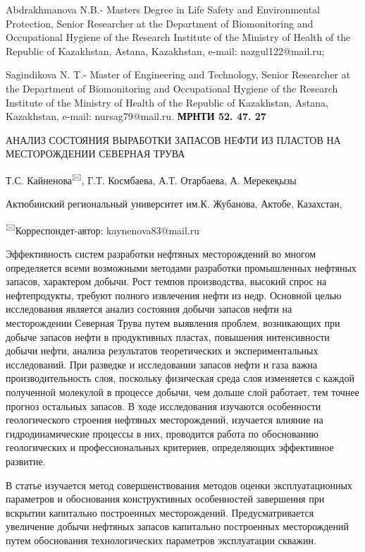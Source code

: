 Abdrakhmanova N.B.- Master\textquotesingle s Degree in Life Safety and
Environmental Protection, Senior Researcher at the Department of
Biomonitoring and Occupational Hygiene of the Research Institute of the
Ministry of Health of the Republic of Kazakhstan, Astana, Kazakhstan,
e-mail: nazgul122@mail.ru;

Sagindikova N. T.- Master of Engineering and Technology, Senior
Researcher at the Department of Biomonitoring and Occupational Hygiene
of the Research Institute of the Ministry of Health of the Republic of
Kazakhstan, Astana, Kazakhstan, e-mail: nursag79@mail.ru.\newpage
{\bfseries МРНТИ 52. 47. 27}

АНАЛИЗ СОСТОЯНИЯ ВЫРАБОТКИ ЗАПАСОВ НЕФТИ ИЗ ПЛАСТОВ НА МЕСТОРОЖДЕНИИ
СЕВЕРНАЯ ТРУВА

Т.С. Кайненова\textsuperscript{🖂}, Г.Т. Космбаева, А.Т. Отарбаева, А.
Мерекеқызы

Актюбинский региональный университет им.К. Жубанова, Актобе, Казахстан,

\textsuperscript{🖂}Корреспондет-автор: kaynenova83@mail.ru

Эффективность систем разработки нефтяных месторождений во многом
определяется всеми возможными методами разработки промышленных нефтяных
запасов, характером добычи. Рост темпов производства, высокий спрос на
нефтепродукты, требуют полного извлечения нефти из недр. Основной целью
исследования является анализ состояния добычи запасов нефти на
месторождении Северная Трува путем выявления проблем, возникающих при
добыче запасов нефти в продуктивных пластах, повышения интенсивности
добычи нефти, анализа результатов теоретических и экспериментальных
исследований. При разведке и исследовании запасов нефти и газа важна
производительность слоя, поскольку физическая среда слоя изменяется с
каждой полученной молекулой в процессе добычи, чем дольше слой работает,
тем точнее прогноз остальных запасов. В ходе исследования изучаются
особенности геологического строения нефтяных месторождений, изучается
влияние на гидродинамические процессы в них, проводится работа по
обоснованию геологических и профессиональных критериев, определяющих
эффективное развитие.

В статье изучается метод совершенствования методов оценки
эксплуатационных параметров и обоснования конструктивных особенностей
завершения при вскрытии капитально построенных месторождений.
Предусматривается увеличение добычи нефтяных запасов капитально
построенных месторождений путем обоснования технологических параметров
эксплуатации скважин.

